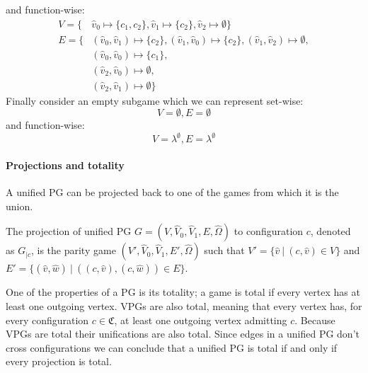 and function-wise:
\begin{align*}
V = \{&\hat{v}_0 \mapsto \{c_1,c_2\},\hat{v}_1 \mapsto \{c_2\},\hat{v}_2 \mapsto \emptyset\}\\
E = \{&(\hat{v}_0,\hat{v}_1) \mapsto \{c_2\},(\hat{v}_1,\hat{v}_0) \mapsto \{c_2\},(\hat{v}_1,\hat{v}_2) \mapsto \emptyset,\\
&(\hat{v}_0,\hat{v}_0) \mapsto \{c_1\},\\
&(\hat{v}_2,\hat{v}_0) \mapsto \emptyset,\\
&(\hat{v}_2,\hat{v}_1) \mapsto \emptyset\}
\end{align*}
Finally consider an empty subgame which we can represent set-wise:
\[ V = \emptyset, E = \emptyset \]
and function-wise:
\[ V = \lambda^\emptyset, E = \lambda^\emptyset \]
\paragraph{Projections and totality}
A unified PG can be projected back to one of the games from which it is the union.
\begin{definition}
	The projection of unified PG $G = (V,\hat{V}_0, \hat{V}_1,E,\hat{\Omega})$ to configuration $c$, denoted as $G_{|c}$, is the parity game $(V',\hat{V}_0,\hat{V}_1,E',\hat{\Omega})$ such that $V' = \{\hat{v}\ |\ (c,\hat{v}) \in V \}$ and $E' = \{ (\hat{v},\hat{w})\ |\ ((c,\hat{v}),(c,\hat{w})) \in E \} $.
\end{definition}

One of the properties of a PG is its totality; a game is total if every vertex has at least one outgoing vertex. VPGs are also total, meaning that every vertex has, for every configuration $c \in \mathfrak{C}$, at least one outgoing vertex admitting $c$. Because VPGs are total their unifications are also total. Since edges in a unified PG don't cross configurations we can conclude that a unified PG is total if and only if every projection is total.

